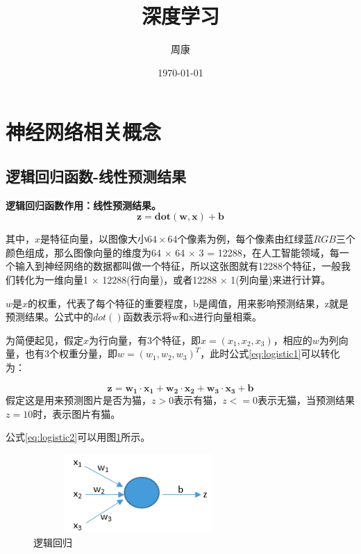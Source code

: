 \documentclass[UTF-8]{article} %
\title{深度学习}
\author{周康}
\date{\today}
\begin{document}
	\maketitle
	\tableofcontents
	
	\section{神经网络相关概念}
	\subsection{逻辑回归函数-线性预测结果}
	\textbf{逻辑回归函数作用：线性预测结果。}
	\begin{equation}
		\bm{z = dot(w, x) + b} \label{eq:logistic1}
	\end{equation}
	
	
	其中，$x$是特征向量，以图像大小$64 \times 64$个像素为例，每个像素由红绿蓝$RGB$三个颜色组成，那么图像向量的维度为64 $\times$ 64 $\times$ 3 = 12288，在人工智能领域，每一个输入到神经网络的数据都叫做一个特征，所以这张图就有12288个特征，一般我们转化为一维向量1 $\times$ 12288(行向量)，或者12288 $\times$ 1(列向量)来进行计算。
	
	$w$是$x$的权重，代表了每个特征的重要程度，b是阈值，用来影响预测结果，z就是预测结果。公式中的$dot()$函数表示将w和x进行向量相乘。
	
	为简便起见，假定$x$为行向量，有3个特征，即$x=(x_1, x_2, x_3)$，相应的$w$为列向量，也有3个权重分量，即$w=(w_1, w_2, w_3)^T$，此时公式\ref{eq:logistic1}可以转化为：

	\begin{equation}
		\bm{z = w_1 \cdot x_1 + w_2 \cdot x_2 + w_3 \cdot x_3 + b} \label{eq:logistic2}
	\end{equation}
	假定这是用来预测图片是否为猫，$z>0$表示有猫，$z<=0$表示无猫，当预测结果$z=10$时，表示图片有猫。
	
	公式\ref{eq:logistic2}可以用图\ref{fig:1nn}所示。
	
	\begin{figure}[htb]			%
		\centering
		\includegraphics[width=8cm, height=3cm]{pictures/逻辑回归/1nn}
		\caption{逻辑回归}
		\label{fig:1nn}
	\end{figure}
\end{document}
